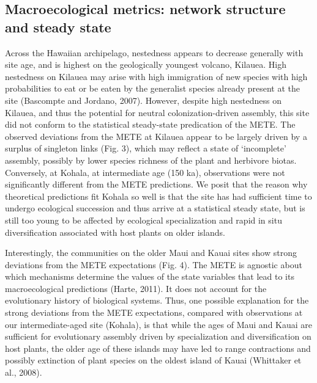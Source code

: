 \subsection{Macroecological metrics: network structure and steady
state}

Across the Hawaiian archipelago, nestedness appears to decrease
generally with site age, and is highest on the geologically youngest
volcano, Kilauea. High nestedness on Kilauea may arise with high
immigration of new species with high probabilities to eat or be eaten
by the generalist species already present at the site (Bascompte and
Jordano, 2007). However, despite high nestedness on Kilauea, and thus
the potential for neutral colonization-driven assembly, this site did
not conform to the statistical steady-state predication of the
METE. The observed deviations from the METE at Kilauea appear to be
largely driven by a surplus of singleton links (Fig. 3), which may
reflect a state of ‘incomplete’ assembly, possibly by lower species
richness of the plant and herbivore biotas. Conversely, at Kohala, at
intermediate age (150 ka), observations were not significantly
different from the METE predictions. We posit that the reason why
theoretical predictions fit Kohala so well is that the site has had
sufficient time to undergo ecological succession and thus arrive at a
statistical steady state, but is still too young to be affected by
ecological specialization and rapid in situ diversification associated
with host plants on older islands.

Interestingly, the communities on the older Maui and Kauai sites show
strong deviations from the METE expectations (Fig. 4). The METE is
agnostic about which mechanisms determine the values of the state
variables that lead to its macroecological predictions (Harte,
2011). It does not account for the evolutionary history of biological
systems. Thus, one possible explanation for the strong deviations from
the METE expectations, compared with observations at our
intermediate-aged site (Kohala), is that while the ages of Maui and
Kauai are sufficient for evolutionary assembly driven by
specialization and diversification on host plants, the older age of
these islands may have led to range contractions and possibly
extinction of plant species on the oldest island of Kauai (Whittaker
et al., 2008).

